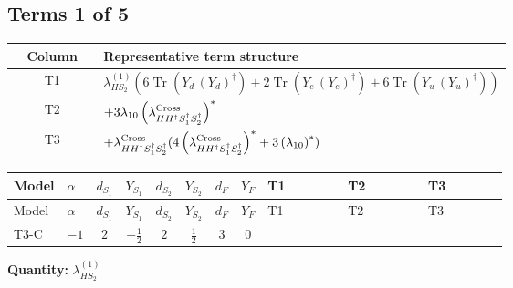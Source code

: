 \documentclass[8pt]{article}
\begin{document}
\begin{landscape}
\subsection*{Terms 1 of 5}
\begin{center}
\begin{tabular}{@{}c >{\raggedright\arraybackslash}p{0.82\linewidth}@{}}
\toprule
Column & Representative term structure \\
\midrule
T1 & \(\displaystyle {\lambda_{HS_2}^{(1)}} (6 \operatorname{Tr}\!\left({Y_d}\,\left({Y_d}\right)^{\dagger}\right)+2 \operatorname{Tr}\!\left({Y_e}\,\left({Y_e}\right)^{\dagger}\right)+6 \operatorname{Tr}\!\left({Y_u}\,\left({Y_u}\right)^{\dagger}\right))\) \\
\midrule
T2 & \(\displaystyle +3 {\lambda_{10}} \left({\lambda_{H H^\dagger S_1^\dagger S_2^\dagger}^{\rm Cross}}\right)^{*}\) \\
\midrule
T3 & \(\displaystyle +{\lambda_{H H^\dagger S_1^\dagger S_2^\dagger}^{\rm Cross}} (4 \left({\lambda_{H H^\dagger S_1^\dagger S_2^\dagger}^{\rm Cross}}\right)^{*}+3 \left({\lambda_{10}}\right)^{*})\) \\
\midrule
\bottomrule
\end{tabular}
\end{center}
\smallskip
\tiny
\begin{longtable}{@{}llcccccc >{\raggedright\arraybackslash}p{0.21\linewidth} >{\raggedright\arraybackslash}p{0.21\linewidth} >{\raggedright\arraybackslash}p{0.21\linewidth}@{}}
\toprule
Model & $\alpha$ & $d_{S_1}$ & $Y_{S_1}$ & $d_{S_2}$ & $Y_{S_2}$ & $d_F$ & $Y_F$ & T1 & T2 & T3 \\
\midrule
\endfirsthead
\toprule
Model & $\alpha$ & $d_{S_1}$ & $Y_{S_1}$ & $d_{S_2}$ & $Y_{S_2}$ & $d_F$ & $Y_F$ & T1 & T2 & T3 \\
\midrule
\endhead
T3-C & $-1$ & $2$ & $-\frac{1}{2}$ & $2$ & $\frac{1}{2}$ & $3$ & $0$ & \scriptsize\adjustbox{max width=\linewidth}{$\begin{gathered} {\lambda_{HS_2}^{(1)}} (6 \operatorname{Tr}\!\left({Y_d}\,\left({Y_d}\right)^{\dagger}\right)+2 \operatorname{Tr}\!\left({Y_e}\,\left({Y_e}\right)^{\dagger}\right)+6 \operatorname{Tr}\!\left({Y_u}\,\left({Y_u}\right)^{\dagger}\right))\end{gathered}$} & \scriptsize\adjustbox{max width=\linewidth}{$\begin{gathered} +3 {\lambda_{10}} \left({\lambda_{H H^\dagger S_1^\dagger S_2^\dagger}^{\rm Cross}}\right)^{*}\end{gathered}$} & \scriptsize\adjustbox{max width=\linewidth}{$\begin{gathered} +{\lambda_{H H^\dagger S_1^\dagger S_2^\dagger}^{\rm Cross}} (4 \left({\lambda_{H H^\dagger S_1^\dagger S_2^\dagger}^{\rm Cross}}\right)^{*}+3 \left({\lambda_{10}}\right)^{*})\end{gathered}$} \\
\midrule
\bottomrule
\end{longtable}
\clearpage
\noindent\textbf{Quantity: }$\lambda_{HS_2}^{(1)}$\par\smallskip

\end{landscape}
\end{document}
